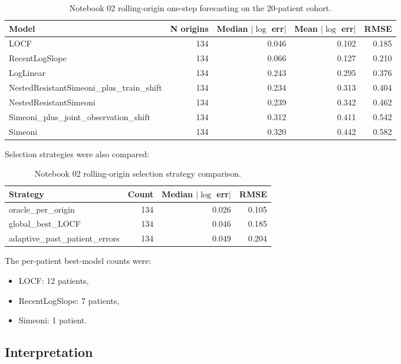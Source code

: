 \documentclass[11pt,a4paper]{article}
\begin{document}
\begin{table}[H]
\centering
\small
\caption{Notebook 02 rolling-origin one-step forecasting on the 20-patient cohort.}
\label{tab:n02-results}
\begin{tabular}{lrrrr}
\toprule
Model & N origins & Median $|\log$ err$|$ & Mean $|\log$ err$|$ & RMSE \\
\midrule
LOCF & 134 & 0.046 & 0.102 & 0.185 \\
RecentLogSlope & 134 & 0.066 & 0.127 & 0.210 \\
LogLinear & 134 & 0.243 & 0.295 & 0.376 \\
NestedResistantSimeoni\_plus\_train\_shift & 134 & 0.234 & 0.313 & 0.404 \\
NestedResistantSimeoni & 134 & 0.239 & 0.342 & 0.462 \\
Simeoni\_plus\_joint\_observation\_shift & 134 & 0.312 & 0.411 & 0.542 \\
Simeoni & 134 & 0.320 & 0.442 & 0.582 \\
\bottomrule
\end{tabular}
\end{table}

Selection strategies were also compared:

\begin{table}[H]
\centering
\small
\caption{Notebook 02 rolling-origin selection strategy comparison.}
\label{tab:n02-selection}
\begin{tabular}{lrrr}
\toprule
Strategy & Count & Median $|\log$ err$|$ & RMSE \\
\midrule
oracle\_per\_origin & 134 & 0.026 & 0.105 \\
global\_best\_LOCF & 134 & 0.046 & 0.185 \\
adaptive\_past\_patient\_errors & 134 & 0.049 & 0.204 \\
\bottomrule
\end{tabular}
\end{table}

The per-patient best-model counts were:
\begin{itemize}[leftmargin=2em]
    \item LOCF: 12 patients,
    \item RecentLogSlope: 7 patients,
    \item Simeoni: 1 patient.
\end{itemize}

\subsection{Interpretation}
\end{document}
